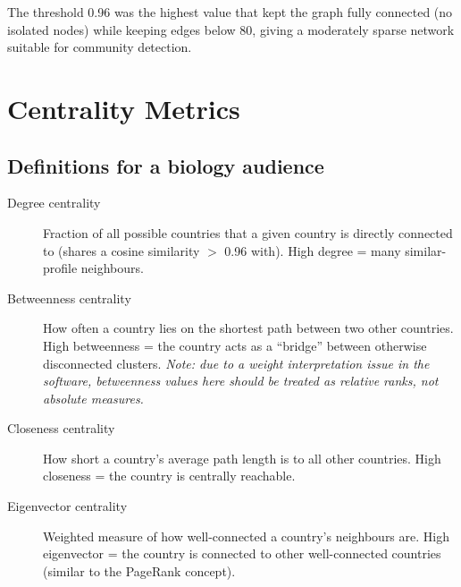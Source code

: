 \documentclass[12pt,a4paper]{article}
\begin{document}
The threshold 0.96 was the highest value that kept the graph fully
connected (no isolated nodes) while keeping edges below 80,
giving a moderately sparse network suitable for community detection.

\section{Centrality Metrics}

\subsection*{Definitions for a biology audience}

\begin{description}
  \item[Degree centrality] Fraction of all possible countries that a
    given country is directly connected to (shares a cosine similarity
    $>$ 0.96 with).
    High degree = many similar-profile neighbours.
  \item[Betweenness centrality] How often a country lies on the
    shortest path between two other countries.
    High betweenness = the country acts as a ``bridge'' between
    otherwise disconnected clusters. \textit{Note: due to a weight
    interpretation issue in the software, betweenness values here
    should be treated as relative ranks, not absolute measures.}
  \item[Closeness centrality] How short a country's average path
    length is to all other countries.
    High closeness = the country is centrally reachable.
  \item[Eigenvector centrality] Weighted measure of how well-connected
    a country's neighbours are.
    High eigenvector = the country is connected to other well-connected
    countries (similar to the PageRank concept).
\end{description}
\end{document}
